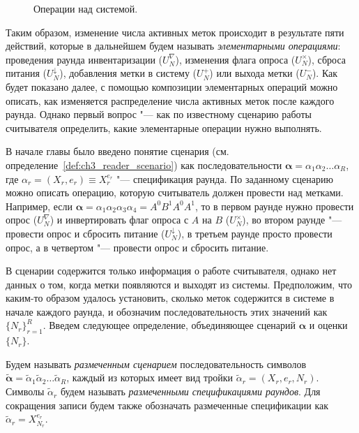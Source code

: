 \begin{figure}[htb]
  \caption{Операции над системой.}
  \label{fig:ch3_operations}
\end{figure}

Таким образом, изменение числа активных меток происходит в результате пяти действий, которые в дальнейшем будем называть \textit{элементарными операциями}: проведения раунда инвентаризации ($U_N^\nabla$), изменения флага опроса ($U_N^\times$), сброса питания ($U_N^\downarrow$), добавления метки в систему ($U_N^+$) или выхода метки ($U_N^-$). Как будет показано далее, с помощью композиции элементарных операций можно описать, как изменяется распределение числа активных меток после каждого раунда. Однако первый вопрос "--- как по известному сценарию работы считывателя определить, какие элементарные операции нужно выполнять.

В начале главы было введено понятие сценария (см. определение~\ref{def:ch3_reader_scenario}) как последовательности $\bm{\alpha} = \alpha_1 \alpha_2 \dots \alpha_R$, где $\alpha_r = (X_r, e_r) \equiv X_r^{e_r}$ "--- спецификация раунда. По заданному сценарию можно описать операцию, которую считыватель должен провести над метками. Например, если $\bm{\alpha} = \alpha_1 \alpha_2 \alpha_3 \alpha_4 = A^0 B^1 A^0 A^1$, то в первом раунде нужно провести опрос ($U_N^\nabla$) и инвертировать флаг опроса с $A$ на $B$ ($U_N^\times$), во втором раунде "--- провести опрос и сбросить питание ($U_N^\downarrow$), в третьем раунде просто провести опрос, а в четвертом "--- провести опрос и сбросить питание.

В сценарии содержится только информация о работе считывателя, однако нет данных о том, когда метки появляются и выходят из системы. Предположим, что каким-то образом удалось установить, сколько меток содержится в системе в начале каждого раунда, и обозначим последовательность этих значений как $\{ N_r \}_{r=1}^R$. Введем следующее определение, объединяющее сценарий $\bm{\alpha}$ и оценки $\{ N_r \}$.

\begin{defn}\label{ref:ch3_marked_scenario}
  Будем называть \textit{размеченным сценарием} последовательность символов $\widetilde{\bm{\alpha}} = \widetilde{\alpha}_1 \widetilde{\alpha}_2 \dots \widetilde{\alpha}_R$, каждый из которых имеет вид тройки $\widetilde{\alpha}_r = (X_r, e_r, N_r)$. Символы $\widetilde{\alpha}_r$ будем называть \textit{размеченными спецификациями раундов}. Для сокращения записи будем также обозначать размеченные спецификации как $\widetilde{\alpha}_r = X_{N_r}^{e_r}$.
\end{defn}

